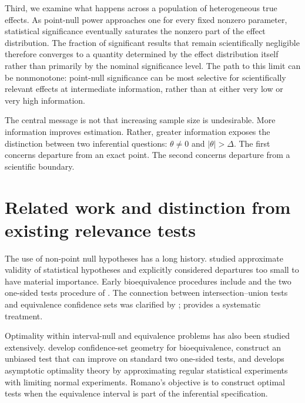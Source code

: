 \documentclass[11pt]{article}
\theoremstyle{remark}
\begin{document}
Third, we examine what happens across a population of heterogeneous true effects. As point-null power approaches one for every fixed nonzero parameter, statistical significance eventually saturates the nonzero part of the effect distribution. The fraction of significant results that remain scientifically negligible therefore converges to a quantity determined by the effect distribution itself rather than primarily by the nominal significance level. The path to this limit can be nonmonotone: point-null significance can be most selective for scientifically relevant effects at intermediate information, rather than at either very low or very high information.

The central message is not that increasing sample size is undesirable. More information improves estimation. Rather, greater information exposes the distinction between two inferential questions: $\theta\ne0$ and $|\theta|>\Delta$. The first concerns departure from an exact point. The second concerns departure from a scientific boundary.

\section{Related work and distinction from existing relevance tests}

The use of non-point null hypotheses has a long history. \citet{hodges1954} studied approximate validity of statistical hypotheses and explicitly considered departures too small to have material importance. Early bioequivalence procedures include \citet{anderson1983} and the two one-sided tests procedure of \citet{schuirmann1987}. The connection between intersection--union tests and equivalence confidence sets was clarified by \citet{bergerhsu1996}; \citet{wellek2010} provides a systematic treatment.

Optimality within interval-null and equivalence problems has also been studied extensively. \citet{brown1995} develop confidence-set geometry for bioequivalence, \citet{brown1997} construct an unbiased test that can improve on standard two one-sided tests, and \citet{romano2005} develops asymptotic optimality theory by approximating regular statistical experiments with limiting normal experiments. Romano's objective is to construct optimal tests when the equivalence interval is part of the inferential specification.
\end{document}
